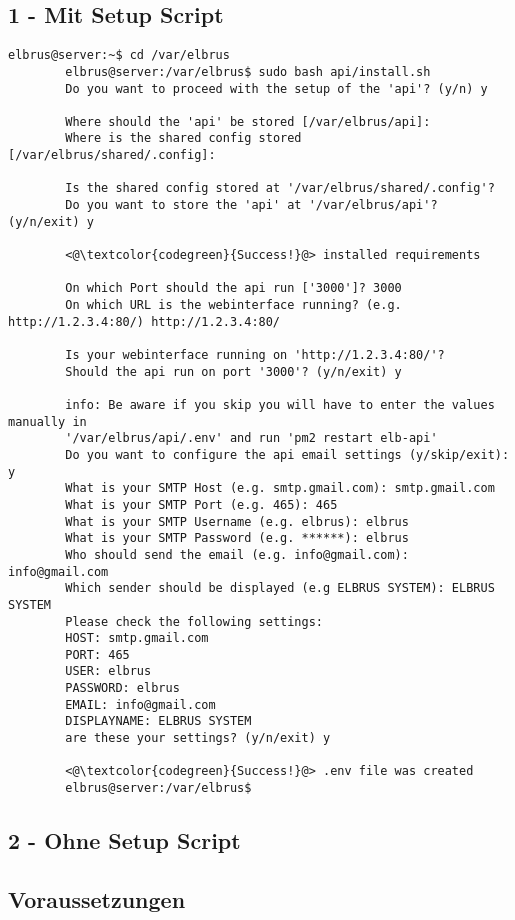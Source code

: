	\subsection{1 - Mit Setup Script}
	
	\lstset{style=commands}
	\begin{lstlisting}[caption={Ausführen des 'install.sh' Scripts.}]
		elbrus@server:~$ cd /var/elbrus
		elbrus@server:/var/elbrus$ sudo bash api/install.sh
		Do you want to proceed with the setup of the 'api'? (y/n) y
		
		Where should the 'api' be stored [/var/elbrus/api]:
		Where is the shared config stored [/var/elbrus/shared/.config]:
		
		Is the shared config stored at '/var/elbrus/shared/.config'?
		Do you want to store the 'api' at '/var/elbrus/api'? (y/n/exit) y
		
		<@\textcolor{codegreen}{Success!}@> installed requirements
		
		On which Port should the api run ['3000']? 3000
		On which URL is the webinterface running? (e.g. http://1.2.3.4:80/) http://1.2.3.4:80/
		
		Is your webinterface running on 'http://1.2.3.4:80/'?
		Should the api run on port '3000'? (y/n/exit) y
		
		info: Be aware if you skip you will have to enter the values manually in 
		'/var/elbrus/api/.env' and run 'pm2 restart elb-api'
		Do you want to configure the api email settings (y/skip/exit): y
		What is your SMTP Host (e.g. smtp.gmail.com): smtp.gmail.com
		What is your SMTP Port (e.g. 465): 465
		What is your SMTP Username (e.g. elbrus): elbrus
		What is your SMTP Password (e.g. ******): elbrus
		Who should send the email (e.g. info@gmail.com): info@gmail.com
		Which sender should be displayed (e.g ELBRUS SYSTEM): ELBRUS SYSTEM
		Please check the following settings:
		HOST: smtp.gmail.com
		PORT: 465
		USER: elbrus
		PASSWORD: elbrus
		EMAIL: info@gmail.com
		DISPLAYNAME: ELBRUS SYSTEM
		are these your settings? (y/n/exit) y
		
		<@\textcolor{codegreen}{Success!}@> .env file was created
		elbrus@server:/var/elbrus$
	\end{lstlisting}
	\newpage
	
	\subsection{2 - Ohne Setup Script}
	\subsection{Voraussetzungen}
	

